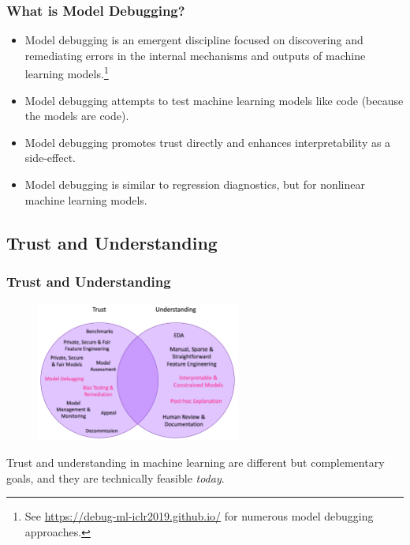 \documentclass[11pt,
               aspectratio=169,
               hyperref={colorlinks}
               ]{beamer}
\begin{document}
		\begin{frame}
		
			\frametitle{What is Model Debugging?}
		
			\begin{itemize}
				\item Model debugging is an emergent discipline focused on discovering and remediating errors in the internal mechanisms and outputs of machine learning models.\footnote{\tiny{See \url{https://debug-ml-iclr2019.github.io/} for numerous model debugging approaches.}} 
				\item Model debugging attempts to test machine learning models like code (because the models are code).
				\item Model debugging promotes trust directly and enhances interpretability as a side-effect.
				\item Model debugging is similar to regression diagnostics, but for nonlinear machine learning models.
			\end{itemize}
		
		\end{frame}
		
		\subsection{Trust and Understanding}
	
			\begin{frame}[t]

  				\frametitle{Trust and Understanding}
          
  				\begin{figure}[htb]
    				\begin{center}
      					\includegraphics[height=130pt]{../img/trust_understanding.png}
    				\end{center}
  			\end{figure}
  
  			Trust and understanding in machine learning are different but complementary goals, and they are technically feasible \textit{today}.
    
		\end{frame}
\end{document}
